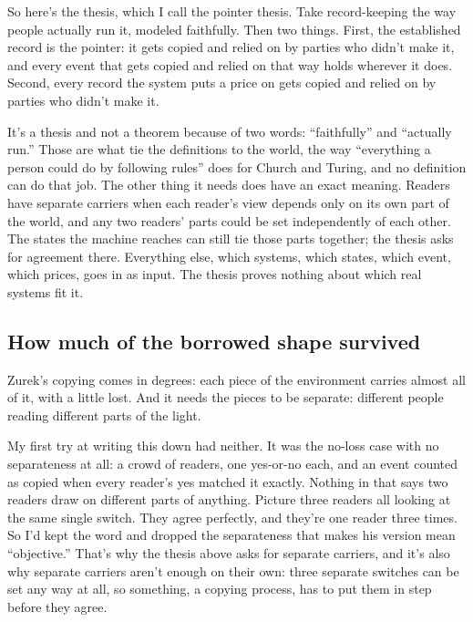 \documentclass[11pt,twoside]{article}
\theoremstyle{thielethm}
\theoremstyle{thieledef}
\theoremstyle{thieledef}
\theoremstyle{thieledef}
\theoremstyle{thielethm}
\theoremstyle{thieleobs}
\theoremstyle{thielethm}
\begin{document}
So here's the thesis, which I call the pointer thesis. Take record-keeping the way people actually run it, modeled faithfully. Then two things. First, the established record is the pointer: it gets copied and relied on by parties who didn't make it, and every event that gets copied and relied on that way holds wherever it does. Second, every record the system puts a price on gets copied and relied on by parties who didn't make it.

It's a thesis and not a theorem because of two words: ``faithfully'' and ``actually run.'' Those are what tie the definitions to the world, the way ``everything a person could do by following rules'' does for Church and Turing, and no definition can do that job. The other thing it needs does have an exact meaning. Readers have separate carriers when each reader's view depends only on its own part of the world, and any two readers' parts could be set independently of each other. The states the machine reaches can still tie those parts together; the thesis asks for agreement there. Everything else, which systems, which states, which event, which prices, goes in as input. The thesis proves nothing about which real systems fit it.

\subsection{How much of the borrowed shape survived}

Zurek's copying comes in degrees: each piece of the environment carries almost all of it, with a little lost. And it needs the pieces to be separate: different people reading different parts of the light.

My first try at writing this down had neither. It was the no-loss case with no separateness at all: a crowd of readers, one yes-or-no each, and an event counted as copied when every reader's yes matched it exactly. Nothing in that says two readers draw on different parts of anything. Picture three readers all looking at the same single switch. They agree perfectly, and they're one reader three times. So I'd kept the word and dropped the separateness that makes his version mean ``objective.'' That's why the thesis above asks for separate carriers, and it's also why separate carriers aren't enough on their own: three separate switches can be set any way at all, so something, a copying process, has to put them in step before they agree.
\end{document}
